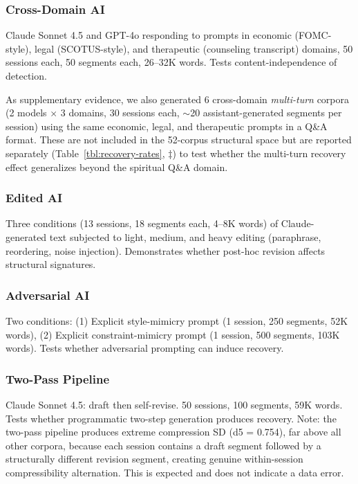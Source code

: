 \documentclass[final]{clv2025}
\begin{document}
\subsubsection{Cross-Domain AI}

Claude Sonnet 4.5 and GPT-4o responding to prompts in economic (FOMC-style), legal (SCOTUS-style), and therapeutic (counseling transcript) domains, 50 sessions each, 50 segments each, 26--32K words. Tests content-independence of detection.

As supplementary evidence, we also generated 6 cross-domain \textit{multi-turn} corpora (2 models $\times$ 3 domains, 30 sessions each, $\sim$20 assistant-generated segments per session) using the same economic, legal, and therapeutic prompts in a Q\&A format. These are not included in the 52-corpus structural space but are reported separately (Table~\ref{tbl:recovery-rates}, $\ddagger$) to test whether the multi-turn recovery effect generalizes beyond the spiritual Q\&A domain.

\subsubsection{Edited AI}

Three conditions (13 sessions, 18 segments each, 4--8K words) of Claude-generated text subjected to light, medium, and heavy editing (paraphrase, reordering, noise injection). Demonstrates whether post-hoc revision affects structural signatures.

\subsubsection{Adversarial AI}

Two conditions: (1) Explicit style-mimicry prompt (1 session, 250 segments, 52K words), (2) Explicit constraint-mimicry prompt (1 session, 500 segments, 103K words). Tests whether adversarial prompting can induce recovery.

\subsubsection{Two-Pass Pipeline}

Claude Sonnet 4.5: draft then self-revise. 50 sessions, 100 segments, 59K words. Tests whether programmatic two-step generation produces recovery. Note: the two-pass pipeline produces extreme compression SD (d5 = 0.754), far above all other corpora, because each session contains a draft segment followed by a structurally different revision segment, creating genuine within-session compressibility alternation. This is expected and does not indicate a data error.
\end{document}
